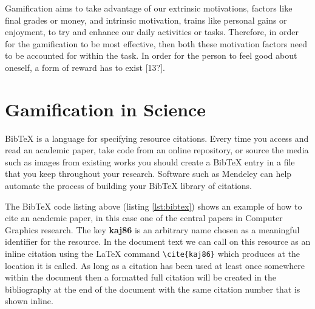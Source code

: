 		Gamification aims to take advantage of our extrinsic motivations, factors like final grades or money, and intrinsic motivation, trains like personal gains or enjoyment, to try and enhance our daily activities or tasks. Therefore, in order for the gamification to be most effective, then both these motivation factors need to be accounted for within the task. In order for the person to feel good about oneself, a form of reward has to exist [13?].
		
		
		
			
	\section{Gamification in Science}
		\label{sec:resources_bibtex}
	
		BibTeX is a language for specifying resource citations. Every time you access and read an academic paper, take code from an online repository, or source the media such as images from existing works you should create a BibTeX entry in a file that you keep throughout your research. Software such as Mendeley \cite{mendeley} can help automate the process of building your BibTeX library of citations. 
		
		
		
		The BibTeX code listing above (listing \ref{lst:bibtex}) shows an example of how to cite an academic paper, in this case one of the central papers in Computer Graphics research. The key \textbf{kaj86} is an arbitrary name chosen as a meaningful identifier for the resource. In the document text we can call on this resource as an inline citation using the LaTeX command \lstinline|\cite{kaj86}| which produces \cite{kaj86} at the location it is called. As long as a citation has been used at least once somewhere within the document then a formatted full citation will be created in the bibliography at the end of the document with the same citation number that is shown inline.
		
